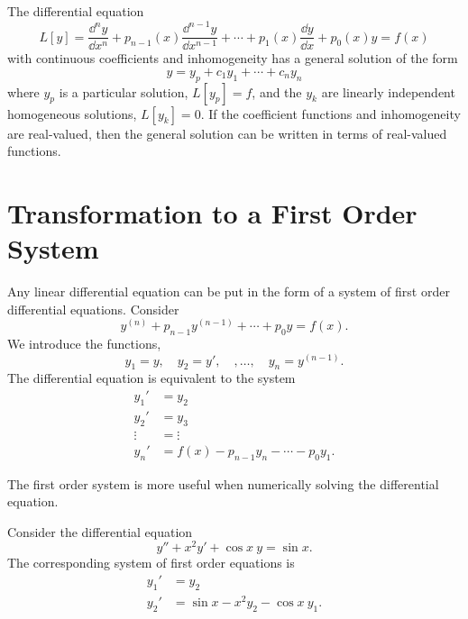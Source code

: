 \begin{Result}
  \label{result nth order linear ode, nature of solutions}
  The differential equation
  \[
  L[y] = \frac{\dd^n y}{\dd x^n} + p_{n-1}(x) \frac{\dd^{n-1} y}{\dd x^{n-1}} + \cdots
  + p_1(x) \frac{\dd y}{\dd x} + p_0(x) y = f(x)
  \]
  with continuous coefficients and inhomogeneity has a general solution of the
  form
  \[ 
  y = y_p + c_1 y_1 + \cdots + c_n y_n
  \]
  where $y_p$ is a particular solution, $L[y_p] = f$, and the $y_k$ are linearly
  independent homogeneous solutions, $L[y_k] = 0$.  If the coefficient functions
  and inhomogeneity are real-valued, then the general solution can be written
  in terms of real-valued functions.
\end{Result}








\section{Transformation to a First Order System}



Any linear differential equation can be put in the form of a system of 
first order differential equations.  Consider 
\[ y^{(n)} + p_{n-1} y^{(n-1)} + \cdots + p_0 y = f(x). \]
We introduce the functions,
\[ y_1 = y, \quad y_2 = y', \quad, \ldots, \quad y_n = y^{(n-1)}. \]
The differential equation is equivalent to the system
\begin{align*}
  y_1'    &= y_2 \\
  y_2'    &= y_3 \\
  \vdots      &= \vdots \\
  y_n'    &= f(x) - p_{n-1} y_n - \cdots - p_0 y_1.
\end{align*}

The first order system is more useful when numerically solving the 
differential equation.


\begin{Example}
  Consider the differential equation
  \[ y'' + x^2 y' + \cos x\ y = \sin x. \]
  The corresponding system of first order equations is
  \begin{align*}
    y_1'    &= y_2 \\
    y_2'    &= \sin x - x^2 y_2 - \cos x\ y_1.
  \end{align*}
\end{Example}




